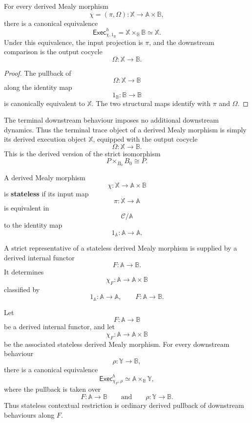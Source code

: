 \begin{proposition}
\label{prop:derived-terminal-trace-case}
For every derived Mealy morphism
\[
\chi=(\pi,\Omega):\mathbb X\to\mathbb A\times\mathbb B,
\]
there is a canonical equivalence
\[
\mathsf{Exec}^h_{\chi,1_{\mathbb B}}
=
\mathbb X\times_{\mathbb B}\mathbb B
\simeq
\mathbb X.
\]
Under this equivalence, the input projection is \(\pi\), and the downstream
comparison is the output cocycle
\[
\Omega:\mathbb X\to\mathbb B.
\]
\end{proposition}

\begin{proof}
The pullback of
\[
\Omega:\mathbb X\to\mathbb B
\]
along the identity map
\[
1_{\mathbb B}:\mathbb B\to\mathbb B
\]
is canonically equivalent to \(\mathbb X\). The two structural maps identify
with \(\pi\) and \(\Omega\).
\end{proof}

\begin{remark}
\label{rem:derived-terminal-trace-interpretation}
The terminal downstream behaviour imposes no additional downstream dynamics.
Thus the terminal trace object of a derived Mealy morphism is simply its
derived execution object \(\mathbb X\), equipped with the output cocycle
\[
\Omega:\mathbb X\to\mathbb B.
\]
This is the derived version of the strict isomorphism
\[
P\times_{B_0}B_0\cong P.
\]
\end{remark}

\begin{definition}
\label{def:stateless-derived-mealy-relative}
A derived Mealy morphism
\[
\chi:\mathbb X\to\mathbb A\times\mathbb B
\]
is \textbf{stateless} if its input map
\[
\pi:\mathbb X\to\mathbb A
\]
is equivalent in
\[
\mathcal C/\mathbb A
\]
to the identity map
\[
1_{\mathbb A}:\mathbb A\to\mathbb A.
\]
\end{definition}

A strict representative of a stateless derived Mealy morphism is supplied by a
derived internal functor
\[
F:\mathbb A\to\mathbb B.
\]
It determines
\[
\chi_F:\mathbb A\to\mathbb A\times\mathbb B
\]
classified by
\[
1_{\mathbb A}:\mathbb A\to\mathbb A,
\qquad
F:\mathbb A\to\mathbb B.
\]

\begin{proposition}
\label{prop:derived-stateless-contextual-restriction}
Let
\[
F:\mathbb A\to\mathbb B
\]
be a derived internal functor, and let
\[
\chi_F:\mathbb A\to\mathbb A\times\mathbb B
\]
be the associated stateless derived Mealy morphism. For every downstream
behaviour
\[
\rho:\mathbb Y\to\mathbb B,
\]
there is a canonical equivalence
\[
\mathsf{Exec}^h_{\chi_F,\rho}
\simeq
\mathbb A\times_{\mathbb B}\mathbb Y,
\]
where the pullback is taken over
\[
F:\mathbb A\to\mathbb B
\qquad
\text{and}
\qquad
\rho:\mathbb Y\to\mathbb B.
\]
Thus stateless contextual restriction is ordinary derived pullback of
downstream behaviours along \(F\).
\end{proposition}

